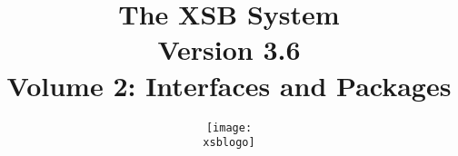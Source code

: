 \documentclass[12pt]{report}
\newcommand{\version}{Version 3.6}
\newcommand{\xsblogo}{{xsb-logo}}
\begin{document}
\title{\bf The XSB System \\ \version \\ Volume 2:
Interfaces and Packages}

\author{{\texttt{[image: \\xsblogo]}}\\
        \ \\ \ \\
} 

\maketitle


\thispagestyle{empty}

\newpage
\thispagestyle{empty}
%

\tableofcontents
\newpage        %
  

%
%













%






\printindex
\end{document}
